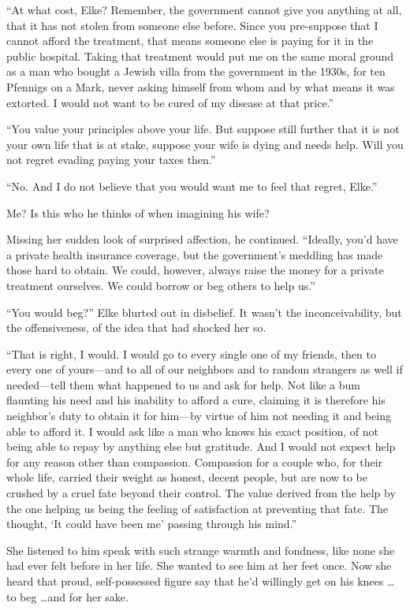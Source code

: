 ``At what cost, Elke? Remember, the government cannot give you anything at all, that it has not stolen from someone else before. Since you pre-suppose that I cannot afford the treatment, that means someone else is paying for it in the public hospital. Taking that treatment would put me on the same moral ground as a man who bought a Jewish villa from the government in the 1930s, for ten Pfennigs on a Mark, never asking himself from whom and by what means it was extorted. I would not want to be cured of my disease at that price.''

``You value your principles above your life. But suppose still further that it is not your own life that is at stake, suppose your wife is dying and needs help. Will you not regret evading paying your taxes then.''

``No. And I do not believe that you would want me to feel that regret, Elke.''

Me? Is this who he thinks of when imagining his wife?

Missing her sudden look of surprised affection, he continued. ``Ideally, you'd have a private health insurance coverage, but the government's meddling has made those hard to obtain. We could, however, always raise the money for a private treatment ourselves. We could borrow or beg others to help us.''

``You would beg?'' Elke blurted out in disbelief. It wasn't the inconceivability, but the offensiveness, of the idea that had shocked her so.

``That is right, I would. I would go to every single one of my friends, then to every one of yours---and to all of our neighbors and to random strangers as well if needed---tell them what happened to us and ask for help. Not like a bum flaunting his need and his inability to afford a cure, claiming it is therefore his neighbor's duty to obtain it for him---by virtue of him not needing it and being able to afford it. I would ask like a man who knows his exact position, of not being able to repay by anything else but gratitude. And I would not expect help for any reason other than compassion. Compassion for a couple who, for their whole life, carried their weight as honest, decent people, but are now to be crushed by a cruel fate beyond their control. The value derived from the help by the one helping us being the feeling of satisfaction at preventing that fate. The thought, `It could have been me' passing through his mind.''

She listened to him speak with such strange warmth and fondness, like none she had ever felt before in her life. She wanted to see him at her feet once. Now she heard that proud, self-possessed figure say that he'd willingly get on his knees \ldots to beg \ldots and for her sake.

